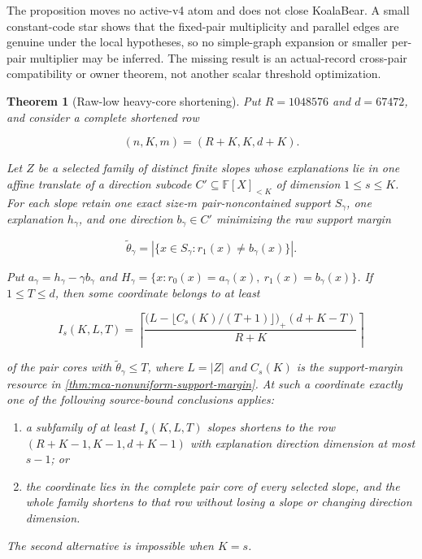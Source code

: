 \documentclass[11pt,a4paper]{amsart}
\numberwithin{equation}{section}
\newtheorem{theorem}{Theorem}[section]
\theoremstyle{remark}
\newcommand{\F}{\mathbb F}\newcommand{\B}{\mathbb B}\newcommand{\K}{\mathbb K}\newcommand{\Z}{\mathbb Z}
\begin{document}
\begin{remark}
The proposition moves no active-v4 atom and does not close KoalaBear.  A
small constant-code star shows that the fixed-pair multiplicity and parallel
edges are genuine under the local hypotheses, so no simple-graph expansion
or smaller per-pair multiplier may be inferred.  The missing result is an
actual-record cross-pair compatibility or owner theorem, not another scalar
threshold optimization.
\end{remark}

\begin{theorem}[Raw-low heavy-core shortening]
\label{thm:mca-raw-low-heavy-core-shortening}
Put \(R=1048576\) and \(d=67472\), and consider a complete shortened row

\[
 (n,K,m)=(R+K,K,d+K).
\]

Let \(Z\) be a selected family of distinct finite slopes whose explanations
lie in one affine translate of a direction subcode \(C'\subseteq
\F[X]_{<K}\) of dimension \(1\le s\le K\).  For each slope retain one exact
size-\(m\) pair-noncontained support \(S_\gamma\), one explanation
\(h_\gamma\), and one direction \(b_\gamma\in C'\) minimizing the raw
support margin

\[
 \widetilde\theta_\gamma=
 |\{x\in S_\gamma:r_1(x)\ne b_\gamma(x)\}|.
\]

Put \(a_\gamma=h_\gamma-\gamma b_\gamma\) and
\(H_\gamma=\{x:r_0(x)=a_\gamma(x),\ r_1(x)=b_\gamma(x)\}\).  If
\(1\le T\le d\), then some coordinate belongs to at least

\[
 I_s(K,L,T)=
 \left\lceil
 \frac{\bigl(L-\lfloor C_s(K)/(T+1)\rfloor\bigr)_+
       (d+K-T)}{R+K}
 \right\rceil
 \tag{RLH}\label{eq:mca-raw-low-heavy-core}
\]

of the pair cores with \(\widetilde\theta_\gamma\le T\), where \(L=|Z|\)
and \(C_s(K)\) is the support-margin resource in
\cref{thm:mca-nonuniform-support-margin}.  At such a coordinate exactly
one of the following source-bound conclusions applies:

\begin{enumerate}
\item a subfamily of at least \(I_s(K,L,T)\) slopes shortens to the row
  \((R+K-1,K-1,d+K-1)\) with explanation direction dimension at most
  \(s-1\); or
\item the coordinate lies in the complete pair core of every selected
  slope, and the whole family shortens to that row without losing a slope or
  changing direction dimension.
\end{enumerate}

The second alternative is impossible when \(K=s\).
\end{theorem}
\end{document}
